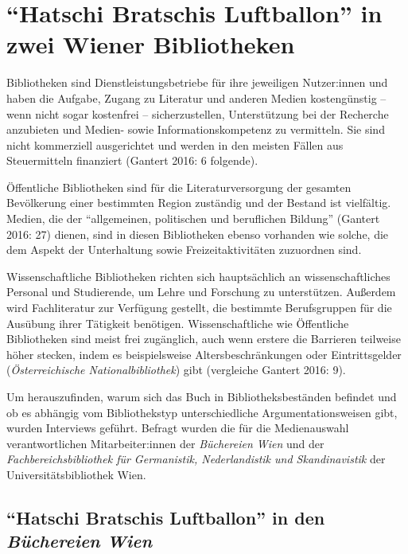 \documentclass[a4paper,
fontsize=11pt,
oneside,
numbers=noperiodatend,
parskip=half-,
bibliography=totoc,
final
]{scrartcl}
\begin{document}
\hypertarget{hatschi-bratschis-luftballon-in-zwei-wiener-bibliotheken}{%
\section{\enquote{Hatschi Bratschis Luftballon} in zwei Wiener
Bibliotheken}\label{hatschi-bratschis-luftballon-in-zwei-wiener-bibliotheken}}

Bibliotheken sind Dienstleistungsbetriebe für ihre jeweiligen
Nutzer:innen und haben die Aufgabe, Zugang zu Literatur und anderen
Medien kostengünstig -- wenn nicht sogar kostenfrei -- sicherzustellen,
Unterstützung bei der Recherche anzubieten und Medien- sowie
Informationskompetenz zu vermitteln. Sie sind nicht kommerziell
ausgerichtet und werden in den meisten Fällen aus Steuermitteln
finanziert (Gantert 2016: 6 folgende).

Öffentliche Bibliotheken sind für die Literaturversorgung der gesamten
Bevölkerung einer bestimmten Region zuständig und der Bestand ist
vielfältig. Medien, die der \enquote{allgemeinen, politischen und beruflichen
Bildung} (Gantert 2016: 27) dienen, sind in diesen Bibliotheken ebenso
vorhanden wie solche, die dem Aspekt der Unterhaltung sowie
Freizeitaktivitäten zuzuordnen sind.

Wissenschaftliche Bibliotheken richten sich hauptsächlich an
wissenschaftliches Personal und Studierende, um Lehre und Forschung zu
unterstützen. Außerdem wird Fachliteratur zur Verfügung gestellt, die
bestimmte Berufsgruppen für die Ausübung ihrer Tätigkeit benötigen.
Wissenschaftliche wie Öffentliche Bibliotheken sind meist frei
zugänglich, auch wenn erstere die Barrieren teilweise höher stecken,
indem es beispielsweise Altersbeschränkungen oder Eintrittsgelder
(\emph{Österreichische Nationalbibliothek}) gibt (vergleiche Gantert
2016: 9).

Um herauszufinden, warum sich das Buch in Bibliotheksbeständen befindet
und ob es abhängig vom Bibliothekstyp unterschiedliche
Argumentationsweisen gibt, wurden Interviews geführt. Befragt wurden die
für die Medienauswahl verantwortlichen Mitarbeiter:innen der
\emph{Büchereien Wien} und der \emph{Fachbereichsbibliothek für
Germanistik, Nederlandistik und Skandinavistik} der
Universitätsbibliothek Wien.

\hypertarget{hatschi-bratschis-luftballon-in-den-buxfcchereien-wien}{%
\subsection{\texorpdfstring{\enquote{Hatschi Bratschis Luftballon} in den
\emph{Büchereien
Wien}}{\enquote{Hatschi Bratschis Luftballon} in den Büchereien Wien}}\label{hatschi-bratschis-luftballon-in-den-buxfcchereien-wien}}
\end{document}
